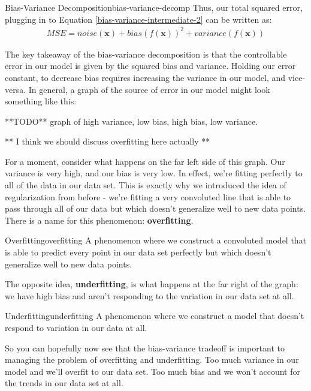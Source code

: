 \begin{derivation}{Bias-Variance Decomposition}{bias-variance-decomp}
    Thus, our total squared error, plugging in to Equation \ref{bias-variance-intermediate-2} can be written as:
    \begin{align*}
        \boxed{\textit{MSE} = \textit{noise}(\textbf{x}) + \textit{bias}(f(\textbf{x}))^{2} + \textit{variance}(f(\textbf{x}))}
    \end{align*}
\end{derivation}

The key takeaway of the bias-variance decomposition is that the controllable error in our model is given by the squared bias and variance. Holding our error constant, to decrease bias requires increasing the variance in our model, and vice-versa. In general, a graph of the source of error in our model might look something like this:

**TODO** graph of high variance, low bias, high bias, low variance.

** I think we should discuss overfitting here actually **

For a moment, consider what happens on the far left side of this graph. Our variance is very high, and our bias is very low. In effect, we're fitting perfectly to all of the data in our data set. This is exactly why we introduced the idea of regularization from before - we're fitting a very convoluted line that is able to pass through all of our data but which doesn't generalize well to new data points. There is a name for this phenomenon: \textbf{overfitting}.

\begin{definition}{Overfitting}{overfitting}
    A phenomenon where we construct a convoluted model that is able to predict every point in our data set perfectly but which doesn't generalize well to new data points.
\end{definition}

The opposite idea, \textbf{underfitting}, is what happens at the far right of the graph: we have high bias and aren't responding to the variation in our data set at all.

\begin{definition}{Underfitting}{underfitting}
    A phenomenon where we construct a model that doesn't respond to variation in our data at all.
\end{definition}

So you can hopefully now see that the bias-variance tradeoff is important to managing the problem of overfitting and underfitting. Too much variance in our model and we'll overfit to our data set. Too much bias and we won't account for the trends in our data set at all.

